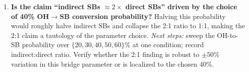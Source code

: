 \begin{enumerate}
\item \textbf{Is the claim ``indirect SBs $\approx 2\times$ direct SBs'' driven
by the choice of 40\% OH$\to$SB conversion probability?}
Halving this probability would roughly halve indirect SBs and collapse the
2:1 ratio to 1:1, making the 2:1 claim a tautology of the parameter choice.
\emph{Next steps:} sweep the OH-to-SB probability over $\{20, 30, 40, 50,
60\}$\% at one condition; record indirect:direct ratio. Verify whether the
2:1 finding is robust to $\pm 50$\% variation in this bridge parameter or is
localized to the chosen 40\%.

\end{enumerate}
